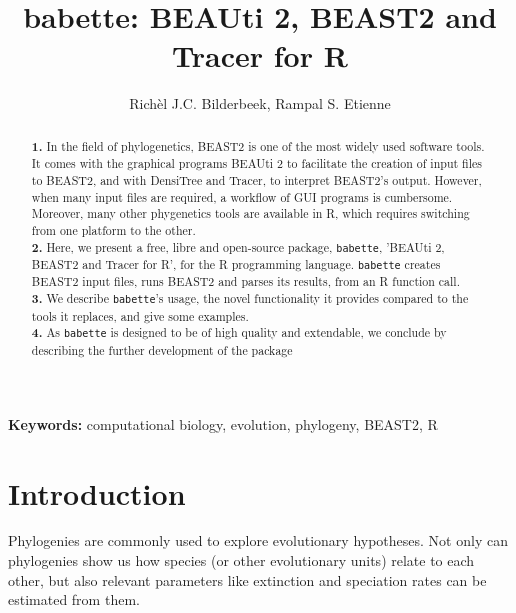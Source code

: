 \documentclass{article}
\title{babette: BEAUti 2, BEAST2 and Tracer for R}
\author{Rich\`el J.C. Bilderbeek, Rampal S. Etienne}
\begin{document}
\maketitle

\begin{abstract}

  \textbf{1. }
    In the field of phylogenetics, 
     BEAST2 is one of the most widely used software tools. 
     It comes with the graphical programs BEAUti 2 to
     facilitate the creation of input files to BEAST2, and
     with DensiTree and Tracer, 
     to interpret BEAST2's output. 
     However, when many input files are required, 
     a workflow of GUI programs is cumbersome. 
     Moreover, many other phygenetics tools are available 
     in R, which requires switching from one platform 
     to the other. \\
  \textbf{2. }
    Here, we present a free, libre and open-source package, \verb;babette;, 
    'BEAUti 2, BEAST2 and Tracer for R', for the R programming language. 
    \verb;babette; creates BEAST2 input files, runs BEAST2 and parses its results, 
    from an R function call. \\
  \textbf{3. }
    We describe \verb;babette;'s usage, the novel functionality it provides
    compared to the tools it replaces, and give some examples. \\
  \textbf{4. }
    As \verb;babette; is designed to be of high quality and extendable, 
    we conclude by describing the further development of the package \\
\end{abstract}


{\bf Keywords:} computational biology, evolution, phylogeny, BEAST2, R


\section{Introduction}

Phylogenies are commonly used to explore evolutionary hypotheses.
Not only can phylogenies show us how species (or other
evolutionary units) relate to each other, 
but also relevant parameters like extinction and 
speciation rates can be estimated from them.
\end{document}
